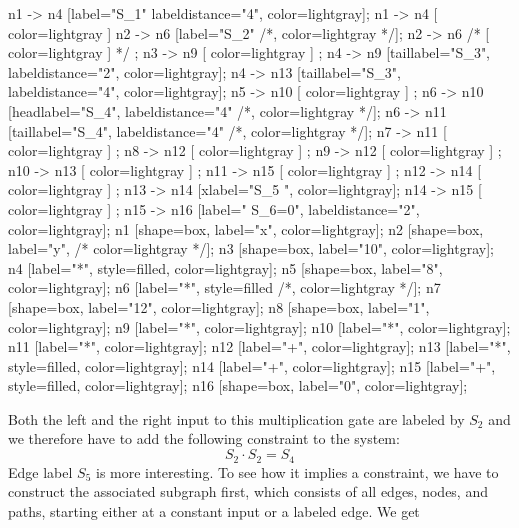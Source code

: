 \begin{example}
\begin{center}
{	n1 -> n4 [label="S_1" labeldistance="4", color=lightgray];
        n1 -> n4 [ color=lightgray ]
	n2 -> n6 [label="S_2" /*, color=lightgray */];
	n2 -> n6 /* [ color=lightgray ] */ ;
	n3 -> n9 [ color=lightgray ] ;
	n4 -> n9 [taillabel="S_3", labeldistance="2", color=lightgray];
	n4 -> n13 [taillabel="S_3", labeldistance="4", color=lightgray];
	n5 -> n10 [ color=lightgray ] ;
	n6 -> n10 [headlabel="S_4", labeldistance="4" /*, color=lightgray */];
	n6 -> n11 [taillabel="S_4", labeldistance="4" /*, color=lightgray */];
	n7 -> n11 [ color=lightgray ] ;
	n8 -> n12 [ color=lightgray ] ;
	n9 -> n12 [ color=lightgray ] ;
	n10 -> n13 [ color=lightgray ] ; 
	n11 -> n15 [ color=lightgray ] ;
	n12 -> n14 [ color=lightgray ] ;	
	n13 -> n14 [xlabel="S_5  ", color=lightgray];
	n14 -> n15 [ color=lightgray ] ;
	n15 -> n16 [label="  S_6=0", labeldistance="2", color=lightgray];
	n1 [shape=box, label="x", color=lightgray];
	n2 [shape=box, label="y", /* color=lightgray */];
	n3 [shape=box, label="10", color=lightgray];
	n4 [label="*", style=filled, color=lightgray];
	n5 [shape=box, label="8", color=lightgray];
	n6 [label="*", style=filled /*, color=lightgray */];
	n7 [shape=box, label="12", color=lightgray];
	n8 [shape=box, label="1", color=lightgray];
	n9 [label="*", color=lightgray];
	n10 [label="*", color=lightgray];
	n11 [label="*", color=lightgray];	
	n12 [label="+", color=lightgray];	
	n13 [label="*", style=filled, color=lightgray];
	n14 [label="+", color=lightgray];
	n15 [label="+", style=filled, color=lightgray];
	n16 [shape=box, label="0", color=lightgray];		
}
\end{center}
Both the left and the right input to this multiplication gate are labeled by $S_2$ and we therefore have to add the following constraint to the system:
$$
S_2 \cdot S_2 = S_4
$$
Edge label $S_5$ is more interesting. To see how it implies a constraint, we have to construct the associated subgraph first, which consists of all edges, nodes, and paths, starting either at a constant input or a labeled edge. We get  
\begin{center}
\end{center}
\end{example}
